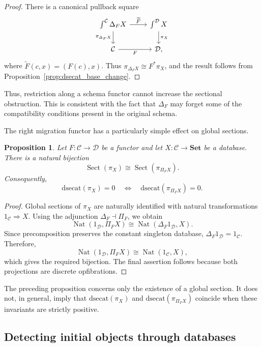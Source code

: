 \documentclass[12pt]{amsart}
\newtheorem{prop}[teo]{Proposition}
\theoremstyle{definition}
\theoremstyle{remark}
\numberwithin{figure}{section}%
\newcommand{\CC}{\mathcal{C}}
\newcommand{\Dc}{\mathcal{D}}
\newcommand{\Sets}{\mathbf{Set}}
\begin{document}
\begin{proof}
There is a canonical pullback square
\[
\begin{tikzcd}
\int^\CC\Delta_FX
  \arrow[r, "\widetilde F"]
  \arrow[d, "\pi_{\Delta_FX}"']
&
\int^\Dc X
  \arrow[d, "\pi_X"]
\\
\CC
  \arrow[r, "F"']
&
\Dc ,
\end{tikzcd}
\]
where \(\widetilde F(c,x)=(F(c),x)\). Thus
\(\pi_{\Delta_FX}\cong F^\ast\pi_X\), and the result follows from
Proposition~\ref{prop:dsecat_base_change}.
\end{proof}

Thus, restriction along a schema functor cannot increase the sectional
obstruction. This is consistent with the fact that \(\Delta_F\) may forget
some of the compatibility conditions present in the original schema.

The right migration functor has a particularly simple effect on global
sections.

\begin{prop}\label{prop:pi_migration_global_sections}
Let \(F\colon\CC\to\Dc\) be a functor and let
\(X\colon\CC\to\Sets\) be a database. There is a natural bijection
\[
\operatorname{Sect}(\pi_X)
\cong
\operatorname{Sect}(\pi_{\Pi_FX}).
\]
Consequently,
\[
\mathrm{dsecat}(\pi_X)=0
\quad\Longleftrightarrow\quad
\mathrm{dsecat}(\pi_{\Pi_FX})=0.
\]
\end{prop}

\begin{proof}
Global sections of \(\pi_X\) are naturally identified with natural
transformations \(1_\CC\Rightarrow X\). Using the adjunction
\(\Delta_F\dashv\Pi_F\), we obtain
\[
\operatorname{Nat}(1_\Dc,\Pi_FX)
\cong
\operatorname{Nat}(\Delta_F1_\Dc,X).
\]
Since precomposition preserves the constant singleton database,
\(\Delta_F1_\Dc=1_\CC\). Therefore,
\[
\operatorname{Nat}(1_\Dc,\Pi_FX)
\cong
\operatorname{Nat}(1_\CC,X),
\]
which gives the required bijection. The final assertion follows because
both projections are discrete opfibrations.
\end{proof}

The preceding proposition concerns only the existence of a global section.
It does not, in general, imply that
\(\mathrm{dsecat}(\pi_X)\) and
\(\mathrm{dsecat}(\pi_{\Pi_FX})\) coincide when these invariants are strictly positive.

\subsection{Detecting initial objects through databases}\label{subsec:global_section_initial}
\end{document}
